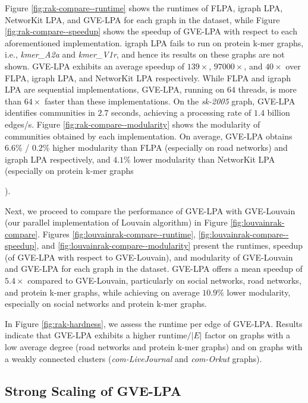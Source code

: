 Figure \ref{fig:rak-compare--runtime} shows the runtimes of FLPA, igraph LPA, NetworKit LPA, and GVE-LPA for each graph in the dataset, while Figure \ref{fig:rak-compare--speedup} shows the speedup of GVE-LPA with respect to each aforementioned implementation. igraph LPA fails to run on protein k-mer graphs, i.e., \textit{kmer\_A2a} and \textit{kmer\_V1r}, and hence its results on these graphs are not shown. GVE-LPA exhibits an average speedup of $139\times$, $97000\times$, and $40\times$ over FLPA, igraph LPA, and NetworKit LPA respectively. While FLPA and igraph LPA are sequential implementations, GVE-LPA, running on $64$ threads, is more than $64\times$ faster than these implementations. On the \textit{sk-2005} graph, GVE-LPA identifies communities in $2.7$ seconds, achieving a processing rate of $1.4$ billion edges/s. Figure \ref{fig:rak-compare--modularity} shows the modularity of communities obtained by each implementation. On average, GVE-LPA obtains $6.6\%$ / $0.2\%$ higher modularity than FLPA (especially on road networks) and igraph LPA respectively, and $4.1\%$ lower modularity than NetworKit LPA (especially on protein k-mer graphs).




Next, we proceed to compare the performance of GVE-LPA with GVE-Louvain (our parallel implementation of Louvain algorithm) in Figure \ref{fig:louvainrak-compare}. Figures \ref{fig:louvainrak-compare--runtime}, \ref{fig:louvainrak-compare--speedup}, and \ref{fig:louvainrak-compare--modularity} present the runtimes, speedup (of GVE-LPA with respect to GVE-Louvain), and modularity of GVE-Louvain and GVE-LPA for each graph in the dataset. GVE-LPA offers a mean speedup of $5.4\times$ compared to GVE-Louvain, particularly on social networks, road networks, and protein k-mer graphs, while achieving on average $10.9\%$ lower modularity, especially on social networks and protein k-mer graphs.

In Figure \ref{fig:rak-hardness}, we assess the runtime per edge of GVE-LPA. Results indicate that GVE-LPA exhibits a higher $\text{runtime}/|E|$ factor on graphs with a low average degree (road networks and protein k-mer graphs) and on graphs with a weakly connected clusters (\textit{com-LiveJournal} and \textit{com-Orkut} graphs).




\subsection{Strong Scaling of GVE-LPA}

